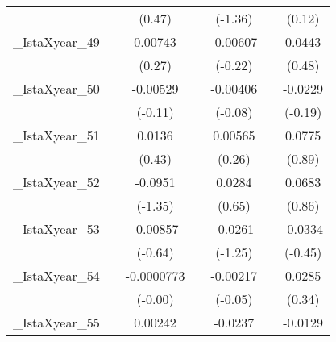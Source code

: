 {\begin{tabular}{l*{6}{c}}
            &                     &      (0.47)         &                     &     (-1.36)         &                     &      (0.12)         \\
[1em]
\_IstaXyear\_49&                     &     0.00743         &                     &    -0.00607         &                     &      0.0443         \\
            &                     &      (0.27)         &                     &     (-0.22)         &                     &      (0.48)         \\
[1em]
\_IstaXyear\_50&                     &    -0.00529         &                     &    -0.00406         &                     &     -0.0229         \\
            &                     &     (-0.11)         &                     &     (-0.08)         &                     &     (-0.19)         \\
[1em]
\_IstaXyear\_51&                     &      0.0136         &                     &     0.00565         &                     &      0.0775         \\
            &                     &      (0.43)         &                     &      (0.26)         &                     &      (0.89)         \\
[1em]
\_IstaXyear\_52&                     &     -0.0951         &                     &      0.0284         &                     &      0.0683         \\
            &                     &     (-1.35)         &                     &      (0.65)         &                     &      (0.86)         \\
[1em]
\_IstaXyear\_53&                     &    -0.00857         &                     &     -0.0261         &                     &     -0.0334         \\
            &                     &     (-0.64)         &                     &     (-1.25)         &                     &     (-0.45)         \\
[1em]
\_IstaXyear\_54&                     &  -0.0000773         &                     &    -0.00217         &                     &      0.0285         \\
            &                     &     (-0.00)         &                     &     (-0.05)         &                     &      (0.34)         \\
[1em]
\_IstaXyear\_55&                     &     0.00242         &                     &     -0.0237         &                     &     -0.0129         \\

\end{tabular}}
